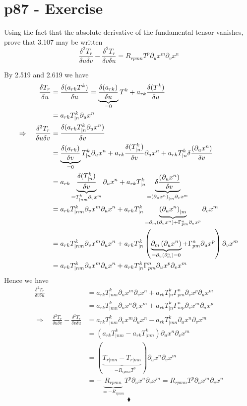 \section{p87 - Exercise}
\begin{tcolorbox}
Using the fact that the absolute derivative of the fundamental tensor vanishes, prove that 3.107 may be written $$ \frac{\delta^2 T_r}{\delta u \delta v} - \frac{\delta^2 T_r}{\delta v \delta u} = R_{rpmn}T^p\partial_u x^m \partial_v x^n $$
\end{tcolorbox}
By 2.519 and 2.619 we have
\begin{align*}
\fdv{T_r}{u} &= \fdv{(a_{rk}T^k)}{u} 
 = \underbrace{\fdv{(a_{rk})}{u}}_{=0}T^k+a_{rk}\fdv{(T^k)}{u}\\
 &= a_{rk}T^k_{|n} \partial_u x^n\\
 \Rightarrow\quad \frac{\delta^2 T_r}{\delta u \delta v} &= \frac{\delta (a_{rk}T^k_{|n} \partial_u x^n)}{\delta v}\\
  & = \underbrace{\frac{\delta (a_{rk})}{\delta v}}_{=0}T^k_{|n} \partial_u x^n+a_{rk}\frac{\delta (T^k_{|n} )}{\delta v}\partial_u x^n+a_{rk}T^k_{|n} \delta \frac{(\partial_u x^n)}{\delta v}\\
   &= a_{rk}\underbrace{\frac{\delta (T^k_{|n} )}{\delta v}}_{=T^k_{|nm}\partial_v x^m} \partial_u x^n+a_{rk}T^k_{|n} \underbrace{\delta \frac{(\partial_u x^n)}{\delta v}}_{=\left(\partial_u x^n \right)_{|m}\partial_v x^m}\\
   &= a_{rk}T^k_{|nm}\partial_v x^m \partial_u x^n+a_{rk}T^k_{|n} \underbrace{\left(\partial_u x^n \right)_{|m}}_{ = \partial_m \left(\partial_u x^n \right) + \Gamma^n_{pm}\partial_u x^p}\partial_v x^m\\
   &= a_{rk}T^k_{|nm}\partial_v x^m \partial_u x^n+a_{rk}T^k_{|n} \left( \underbrace{\partial_m \left(\partial_u x^n \right)}_{=\partial_u \left( \delta_m^n \right)=0} + \Gamma^n_{pm}\partial_u x^p \right)\partial_v x^m\\
   &= a_{rk}T^k_{|nm}\partial_v x^m \partial_u x^n+a_{rk}T^k_{|n} \Gamma^n_{pm}\partial_u x^p \partial_v x^m
\end{align*}
Hence we have 
\begin{align*}
\frac{\delta^2 T_r}{\delta v \delta u} &=a_{rk}T^k_{|nm}\partial_u x^m \partial_v x^n+a_{rk}T^k_{|n} \Gamma^n_{pm}\partial_v x^p \partial_u x^m\\
&=a_{rk}T^k_{|mn}\partial_u x^n \partial_v x^m+a_{rk}T^k_{|n} \Gamma^n_{mp}\partial_v x^m \partial_u x^p\\
\Rightarrow\quad \frac{\delta^2 T_r}{\delta u \delta v} - \frac{\delta^2 T_r}{\delta v \delta u} &= a_{rk}T^k_{|nm}\partial_v x^m \partial_u x^n - a_{rk}T^k_{|mn}\partial_u x^n \partial_v x^m\\
&= \left(a_{rk}T^k_{|nm} - a_{rk}T^k_{|mn}\right)\partial_u x^n \partial_v x^m\\
&= \left(\underbrace{T_{r|nm} - T_{r|mn}}_{= -R_{rpmn}T^p}\right)\partial_u x^n \partial_v x^m\\
&= -\underbrace{R_{rpmn}}_{=-R_{rpnm}} T^p\partial_u x^n \partial_v x^m = 
R_{rpmn} T^p\partial_u x^m \partial_v x^n
\end{align*}
$$\blacklozenge$$
\newpage

